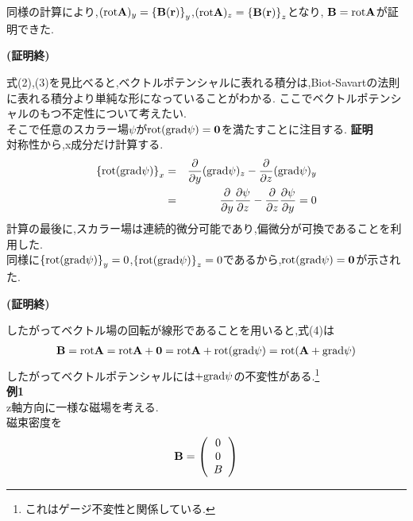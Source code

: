 \documentclass[../main]{subfiles}
\begin{document}
同様の計算により,$({\rm rot}{\bf A})_y=\left\{ {\bf B}({\bf r}) \right\}_y$,$({\rm rot}{\bf A})_z=\left\{ {\bf B}({\bf r}) \right\}_z$となり,
${\bf B}={\rm rot}{\bf A}$が証明できた. \\
\begin{flushright}
{\bf (証明終)}
\end{flushright}
式(2),(3)を見比べると,ベクトルポテンシャルに表れる積分は,Biot-Savartの法則に表れる積分より単純な形になっていることがわかる.
ここでベクトルポテンシャルのもつ不定性について考えたい. \\
そこで任意のスカラー場$\psi$が${\rm rot}({\rm grad}\psi)={\bf 0}$を満たすことに注目する.
{\bf 証明} \\
対称性から,x成分だけ計算する. \\
\begin{eqnarray*}
\left\{ {\rm rot}({\rm grad}\psi) \right\}_x &=& \frac{\partial}{\partial y}({\rm grad}\psi)_z-\frac{\partial}{\partial z}({\rm grad}\psi)_y \\
&=& \frac{\partial}{\partial y} \frac{\partial \psi}{\partial z}- \frac{\partial}{\partial z} \frac{\partial \psi}{\partial y} = 0
\end{eqnarray*}
計算の最後に,スカラー場は連続的微分可能であり,偏微分が可換であることを利用した. \\
同様に$\left\{ {\rm rot}({\rm grad}\psi) \right\}_y=0$,$\left\{ {\rm rot}({\rm grad}\psi) \right\}_z=0$であるから,${\rm rot}({\rm grad}\psi)={\bf 0}$が示された. \\
\begin{flushright}
{\bf (証明終)}
\end{flushright}
したがってベクトル場の回転が線形であることを用いると,式(4)は
\begin{eqnarray*}
{\bf B}={\rm rot}{\bf A}={\rm rot}{\bf A} + {\bf 0} = {\rm rot}{\bf A}+{\rm rot}({\rm grad}\psi)={\rm rot}({\bf A}+{\rm grad}\psi)
\end{eqnarray*}
したがってベクトルポテンシャルには$+{\rm grad}\psi$の不変性がある.\footnote{これはゲージ不変性と関係している.} \\
{\bf 例1} \\
z軸方向に一様な磁場を考える. \\
磁束密度を
\begin{eqnarray*}
{\bf B}=
\left(
\begin{array}{c}
0 \\
0 \\
B
\end{array}
\right)
\end{eqnarray*}
\end{document}
